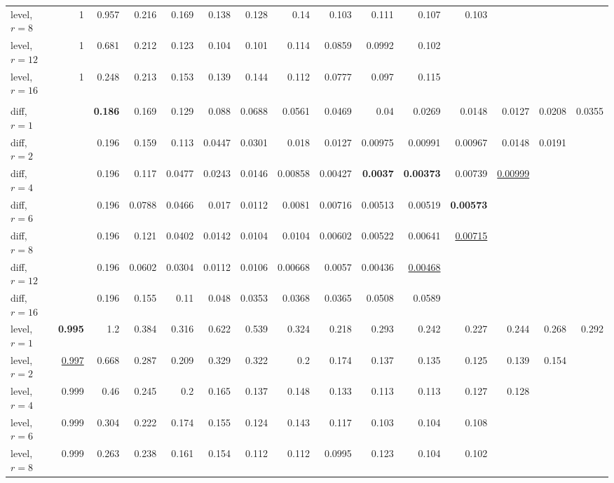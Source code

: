 \begin{table}[t]
\begin{tabular}{lrrrrrrrrrrrrrr}
\quad level, $r{=}8$ & 1 & 0.957 & 0.216 & 0.169 & 0.138 & 0.128 & 0.14 & 0.103 & 0.111 & 0.107 & 0.103 &  &  &  \\
\quad level, $r{=}12$ & 1 & 0.681 & 0.212 & 0.123 & 0.104 & 0.101 & 0.114 & 0.0859 & 0.0992 & 0.102 &  &  &  &  \\
\quad level, $r{=}16$ & 1 & 0.248 & 0.213 & 0.153 & 0.139 & 0.144 & 0.112 & 0.0777 & 0.097 & 0.115 &  &  &  &  \\
\addlinespace
\multicolumn{15}{l}{\textit{Chronos-2 L}} \\
\quad diff, $r{=}1$ &  & \textbf{0.186} & 0.169 & 0.129 & 0.088 & 0.0688 & 0.0561 & 0.0469 & 0.04 & 0.0269 & 0.0148 & 0.0127 & 0.0208 & 0.0355 \\
\quad diff, $r{=}2$ &  & 0.196 & 0.159 & 0.113 & 0.0447 & 0.0301 & 0.018 & 0.0127 & 0.00975 & 0.00991 & 0.00967 & 0.0148 & 0.0191 &  \\
\quad diff, $r{=}4$ &  & 0.196 & 0.117 & 0.0477 & 0.0243 & 0.0146 & 0.00858 & 0.00427 & \textbf{0.0037} & \textbf{0.00373} & 0.00739 & \underline{0.00999} &  &  \\
\quad diff, $r{=}6$ &  & 0.196 & 0.0788 & 0.0466 & 0.017 & 0.0112 & 0.0081 & 0.00716 & 0.00513 & 0.00519 & \textbf{0.00573} &  &  &  \\
\quad diff, $r{=}8$ &  & 0.196 & 0.121 & 0.0402 & 0.0142 & 0.0104 & 0.0104 & 0.00602 & 0.00522 & 0.00641 & \underline{0.00715} &  &  &  \\
\quad diff, $r{=}12$ &  & 0.196 & 0.0602 & 0.0304 & 0.0112 & 0.0106 & 0.00668 & 0.0057 & 0.00436 & \underline{0.00468} &  &  &  &  \\
\quad diff, $r{=}16$ &  & 0.196 & 0.155 & 0.11 & 0.048 & 0.0353 & 0.0368 & 0.0365 & 0.0508 & 0.0589 &  &  &  &  \\
\quad level, $r{=}1$ & \textbf{0.995} & 1.2 & 0.384 & 0.316 & 0.622 & 0.539 & 0.324 & 0.218 & 0.293 & 0.242 & 0.227 & 0.244 & 0.268 & 0.292 \\
\quad level, $r{=}2$ & \underline{0.997} & 0.668 & 0.287 & 0.209 & 0.329 & 0.322 & 0.2 & 0.174 & 0.137 & 0.135 & 0.125 & 0.139 & 0.154 &  \\
\quad level, $r{=}4$ & 0.999 & 0.46 & 0.245 & 0.2 & 0.165 & 0.137 & 0.148 & 0.133 & 0.113 & 0.113 & 0.127 & 0.128 &  &  \\
\quad level, $r{=}6$ & 0.999 & 0.304 & 0.222 & 0.174 & 0.155 & 0.124 & 0.143 & 0.117 & 0.103 & 0.104 & 0.108 &  &  &  \\
\quad level, $r{=}8$ & 0.999 & 0.263 & 0.238 & 0.161 & 0.154 & 0.112 & 0.112 & 0.0995 & 0.123 & 0.104 & 0.102 &  &  &  \\

\end{tabular}
\end{table}
